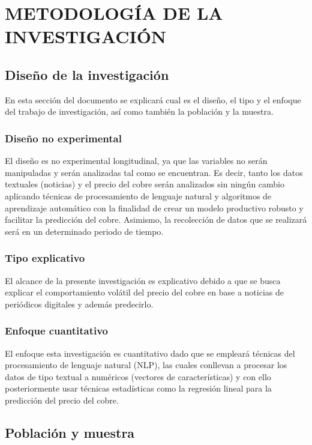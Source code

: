 \chapter{METODOLOGÍA DE LA INVESTIGACIÓN}
\section{Diseño de la investigación}
En esta sección del documento se explicará cual es el diseño, el tipo y el enfoque del trabajo de
investigación, así como también la población y la muestra. 
\subsection{Diseño no experimental}
El diseño es no experimental longitudinal, ya que las variables no serán manipuladas y serán analizadas tal como se encuentran. Es decir, tanto los datos textuales (noticias) y el precio del cobre serán analizados sin ningún cambio aplicando técnicas de procesamiento de lenguaje natural y algoritmos de aprendizaje automático con la finalidad de crear un modelo productivo robusto y facilitar la predicción del cobre. Asimismo, la recolección de datos que se realizará será en un determinado periodo de tiempo. 

\subsection{Tipo explicativo}
El alcance de la presente investigación es explicativo debido a que se busca explicar el comportamiento volátil del precio del cobre en base a noticias de periódicos digitales y además predecirlo.

\subsection{Enfoque cuantitativo}
El enfoque esta investigación es cuantitativo dado que se empleará técnicas del procesamiento de lenguaje natural (NLP), las cuales conllevan a procesar los datos de tipo textual a numéricos (vectores de características) y con ello posteriormente usar técnicas estadísticas como la regresión lineal para la predicción del precio del cobre.



\section{Población y muestra}

